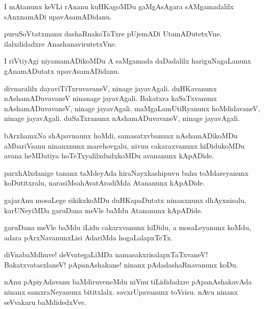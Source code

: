 \documentclass{article}
\begin{document}
\begin{mn}%
I mAtanunx keVLi rAnanu kuHKagoMDu gaMgAsAgara sAMgamadalilx sAnxnamADi upavAsamADidanu.
\end{mn}

\begin{mn}%
puruSoVtatxmanu dashaRnakoTaTxre pUjemADi UtamADutetxVne. ilalxdidadxre AnashanavirutetxVne.
\end{mn}

\begin{mn}%
I riVtiyAgi niyamamADikoMDu A saMgamada daDadalilx hariguNagaLanunx gAnamADutatx 
upavAsamADidanu.
\end{mn}

\begin{mn}%
divnaralilx dayaviTiTxruvavaneV, ninage jayavAgali. duHKavanunx  nAshamADuvavaneV ninanage 
jayavAgali. Bakatxra kaSaTxvanunx nAshamADuvavaneV, ninage jayavAgali. maMgaLamUtiRyanunx 
hoMdidavaneV, ninage jayavAgali. duSaTxranunx nAshamADuvavaneV, ninage jayavAgali.
\end{mn}

\begin{mn}%
bArxhamxNa shApavnaunx hoMdi, samasatxvbanunx nAshamADikoMDu aMbariVsanu ninanxnunx 
marehovgalu, nivnu cakaraxvanunx hiDidukoMDu avana heMDatiya hoTeTxyalilxdudxkoMDu 
avananunx kApADide.
\end{mn}

\begin{mn}%
parxhAlxdanige tananx taMdeyAda hiraNayxkashipuvu bahu toMdareyanunx koDutitxralu, 
narasiMsahAvatAradiMda Atananunx kApADide.
\end{mn}

\begin{mn}%
gajarAnu mosaLege sikikxkoMDu duHKapaDutatx ninanxnunx dhAyxnisalu, karUNeyiMDa garuDana 
meVle baMdu Atananunx kApADide.
\end{mn}

\begin{mn}%
garuDana meVle baMdu iLidu cakarxvanunx hiDidu, a mosaLeyanunx koMdu, adara 
pArxNavanunxLisi AdariMda hogaLalapxTeTx.
\end{mn}

\begin{mn}%
diVnabaMdhuve! deVvategaLiMDa namasakxrisalapxTaTxvaneV! BakatxvatasxlaneV! pApanAshakane! 
ninanx pAdadashaRnavanunx koDu.
\end{mn}

\begin{mn}%
nAnu pApiyAdavanu baMdiruveneMdu niVnu tiLididadxre pApanAshakavAda ninanx samxraNeyanunx 
bititxlalx. savxrUpavanunx toVrisu. nAvu ninanx seVvakaru baMdidedxVve.
\end{mn}
\end{document}
